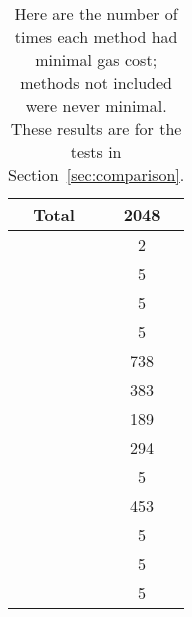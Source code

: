 \begin{table}[pt]
\centering
\begin{tabular}{|c|S[table-format=4.0]|}
\hline
Total & 2048 \\
\hline
\Uniswap{}       &    2 \\
\python{}        &    5 \\
\UnrolledOne{}   &    5 \\
\UnrolledTwo{}   &    5 \\
 \UnrolledThree{} &  738 \\
\WhileOne{}      &  383 \\
\WhileTwo{}      &  189 \\
\WhileThree{}    &  294 \\
\BitLength{}     &    5 \\
\Linear{}        &  453 \\
\HyperFour{}     &    5 \\
\LookupFour{}    &    5 \\
\LookupEight{}   &    5 \\
\hline
\end{tabular}
\caption[Minimal Gas Costs Statistics]{Here are the number of times
    each method had minimal gas cost;
    methods not included were never minimal.
    These results are for the tests in Section~\ref{sec:comparison}.
    }
\label{table:minimal_gas_costs}
\end{table}
